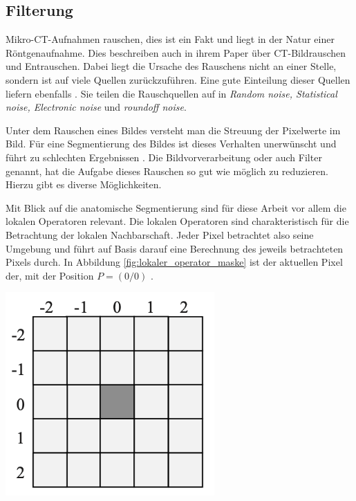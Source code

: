 \subsection{Filterung}
\label{subsec:filter} Mikro-\ac{CT}-Aufnahmen rauschen, dies ist ein Fakt und liegt
in der Natur einer Röntgenaufnahme. Dies beschreiben auch \citet[K.~3]{diwakar2018}
in ihrem Paper über \ac{CT}-Bildrauschen und Entrauschen. Dabei liegt die Ursache
des Rauschens nicht an einer Stelle, sondern ist auf viele Quellen
zurückzuführen. Eine gute Einteilung dieser Quellen liefern ebenfalls \citet[K.~3]{diwakar2018}.
Sie teilen die Rauschquellen auf in \textit{Random noise, Statistical noise,
Electronic noise} und \textit{roundoff noise}.

Unter dem Rauschen eines Bildes versteht man die Streuung der Pixelwerte im Bild.
Für eine Segmentierung des Bildes ist dieses Verhalten unerwünscht und führt zu
schlechten Ergebnissen \citep[vgl.][S.~51]{handels2000}. Die Bildvorverarbeitung
oder auch Filter genannt, hat die Aufgabe dieses Rauschen so gut wie möglich zu reduzieren.
Hierzu gibt es diverse Möglichkeiten.

\begin{minipage}{0.40\textwidth}
	Mit Blick auf die anatomische Segmentierung sind für diese Arbeit vor allem die
	lokalen Operatoren relevant. Die lokalen Operatoren sind charakteristisch für
	die Betrachtung der lokalen Nachbarschaft. Jeder Pixel betrachtet also seine Umgebung
	und führt auf Basis darauf eine Berechnung des jeweils betrachteten Pixels durch.
	In Abbildung \ref{fig:lokaler_operator_maske} ist der aktuellen Pixel der, mit
	der Position $P = (0/0)$ \citep[vgl.][S.~52]{handels2000}.
\end{minipage}
\hfill
\begin{minipage}{0.50\textwidth}
	\centering
	\includegraphics[width=0.60\textwidth]{img/lokaler_operator_maske.jpg}
	\label{fig:lokaler_operator_maske}
\end{minipage}


